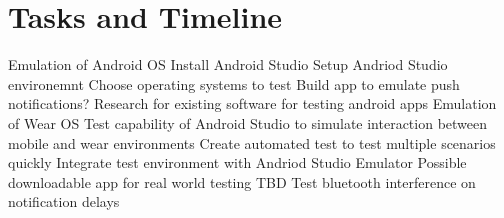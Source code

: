 \section{Tasks and Timeline}
\begin{outline}
	\1 Emulation of Android OS
		\2 Install Android Studio
		\2 Setup Andriod Studio environemnt
		\2 Choose operating systems to test
		\2 Build app to emulate push notifications?
		\2 Research for existing software for testing android apps
	\1 Emulation of Wear OS
		\2 Test capability of Android Studio to simulate interaction between mobile and wear environments
	\1 Create automated test to test multiple scenarios quickly
		\2 Integrate test environment with Andriod Studio Emulator
	\1 Possible downloadable app for real world testing
		\2 TBD
	\1 Test bluetooth interference on notification delays
\end{outline}